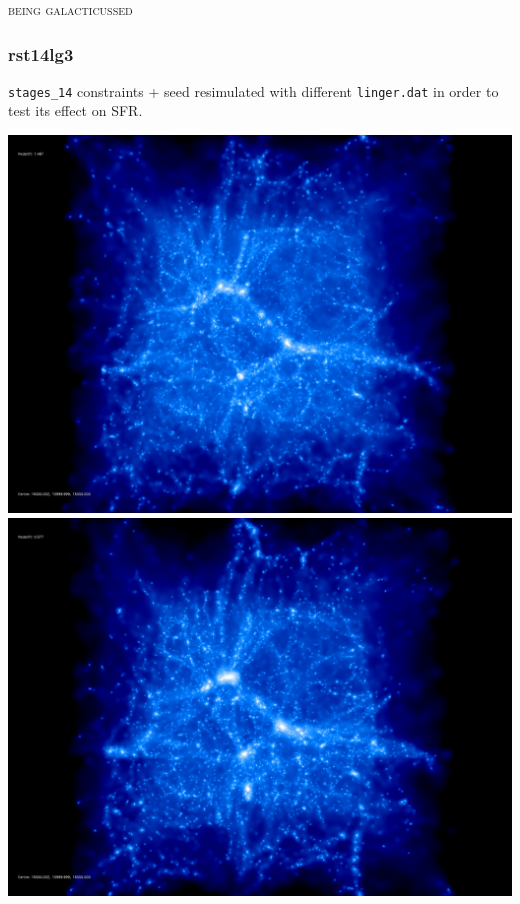 \textsc{being galacticussed}

% 
%
%
%
%
%
%
%

\newpage

\subsubsection{rst14lg3}
\texttt{stages\_14} constraints + seed resimulated with different \texttt{linger.dat} in order
to test its effect on SFR. 

\includegraphics[scale=0.1]{r256/h70/red_st14_log2/50.jpg} 
\includegraphics[scale=0.1]{r256/h70/red_st14_log2/100.jpg} \\ 
